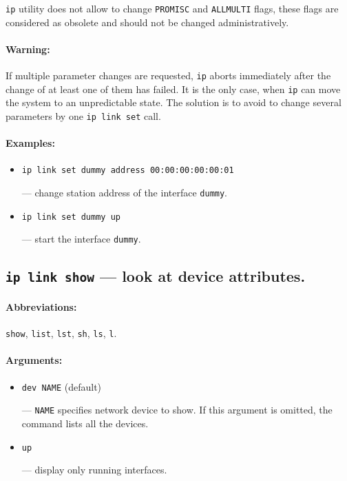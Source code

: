 \vskip 1mm
\begin{NB}
{\tt ip} utility does not allow to change \verb|PROMISC| 
and \verb|ALLMULTI| flags, these flags are considered as
obsolete and should not be changed administratively.
\end{NB}

\paragraph{Warning:} If multiple parameter changes are requested,
\verb|ip| aborts immediately after the change of at least one of them
has failed.
It is the only case, when \verb|ip| can move the system to
an unpredictable state. The solution is to avoid to change
several parameters by one {\tt ip link set} call.

\paragraph{Examples:}
\begin{itemize}
\item \verb|ip link set dummy address 00:00:00:00:00:01|

--- change station address of the interface \verb|dummy|.

\item \verb|ip link set dummy up|

--- start the interface \verb|dummy|.

\end{itemize}


\subsection{{\tt ip link show} --- look at device attributes.}
\label{IP-LINK-SHOW}

\paragraph{Abbreviations:} \verb|show|, \verb|list|, \verb|lst|, \verb|sh|, \verb|ls|,
\verb|l|.

\paragraph{Arguments:}
\begin{itemize}
\item \verb|dev NAME| (default)

--- \verb|NAME| specifies network device to show.
If this argument is omitted, the command lists all the devices.

\item \verb|up|

--- display only running interfaces.

\end{itemize}


